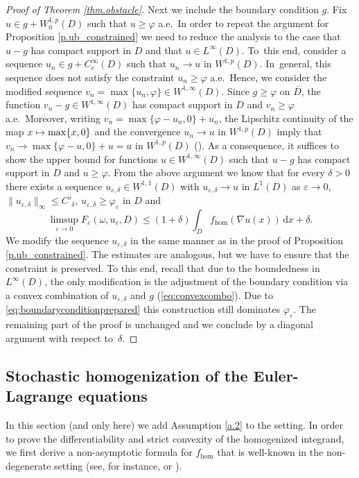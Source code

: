 \documentclass[10pt]{amsart}
\def\mto{\mathchoice{\longmapsto}{\mapsto}{\mapsto}{\mapsto}}
\theoremstyle{definition}
\let\e\varepsilon
\let\w\omega
\newcommand{\dx}{\,\mathrm{d}x}
\begin{document}
\begin{proof}[Proof of Theorem \ref{thm.obstacle}]
Next we include the boundary condition $g$. Fix $u\in g+W^{1,p}_0(D)$ such that $ u\geq\varphi$ a.e.\ In order to repeat the argument for Proposition \ref{p.ub_constrained} we need to reduce the analysis to the case that $u-g$ has compact support in $D$ and that $u\in L^{\infty}(D)$. To~this end, consider a sequence $u_n\in g+C_c^{\infty}(D)$ such that $u_n\to u$ in $W^{1,p}(D)$. In~general, this sequence does not satisfy the constraint $u_n\geq\varphi$ a.e.\ Hence, we consider the modified sequence $v_n=\max\{u_n,\varphi\}\in W^{1,\infty}(D)$. Since $g\geq\varphi$ on $\overline{D}$, the function $v_n-g\in W^{1,\infty}(D)$ has compact support in $D$ and $v_n\geq\varphi$ a.e.\ Moreover, writing $v_n=\max\{\varphi-u_n,0\}+u_n$, the Lipschitz continuity of the map $x\mto \max\{x,0\}$ and the convergence $u_n\to u$ in $W^{1,p}(D)$ imply that $v_n\to \max\{\varphi-u,0\}+u=u$ in $W^{1,p}(D)$ (\cf \cite[Th.\,1]{MM}). As a consequence, it suffices to show the upper bound for functions $u\in W^{1,\infty}(D)$ such that $u-g$ has compact support in $D$ and $u\geq\varphi$. From the above argument we know that for every $\delta>0$ there exists a sequence $u_{\e,\delta}\in W^{1,1}(D)$ with $u_{\e,\delta}\to u$ in $L^1(D)$ as $\e\to 0$, $\|u_{\e,\delta}\|_{\infty}\leq C'_\delta$, $u_{\e,\delta}\geq \varphi_{\e}$ in $D$ and
\begin{equation*}
\limsup_{\e\to 0}F_{\e}(\w,u_{\e},D)\leq(1+\delta)\int_D f_{\hom}(\nabla u(x))\dx+\delta.
\end{equation*}
We modify the sequence $u_{\e,\delta}$ in the same manner as in the proof of Proposition \ref{p.ub_constrained}. The estimates are analogous, but we have to ensure that the constraint is preserved. To this end, recall that due to the boundedness in $L^{\infty}(D)$, the only modification is the adjustment of the boundary condition via a convex combination of $u_{\e,\delta}$ and $g$ (\cf \eqref{eq:convexcombo}). Due to \eqref{eq:boundaryconditionprepared} this construction still dominates $\varphi_{\e}$. The remaining part of the proof is unchanged and we conclude by a diagonal argument with respect to~$\delta$.
\end{proof}

\subsection{Stochastic homogenization of the Euler-Lagrange equations}
In this section (and only here) we add Assumption \ref{a.2} to the setting. In order to prove the differentiability and strict convexity of the homogenized integrand, we first derive a non-asymptotic formula for $f_{\hom}$ that is well-known in the non-degenerate setting (see, for instance, \cite[Chap.\,15]{JKO} or \cite[Lem.\,3.7]{DG_unbounded}).
\end{document}
